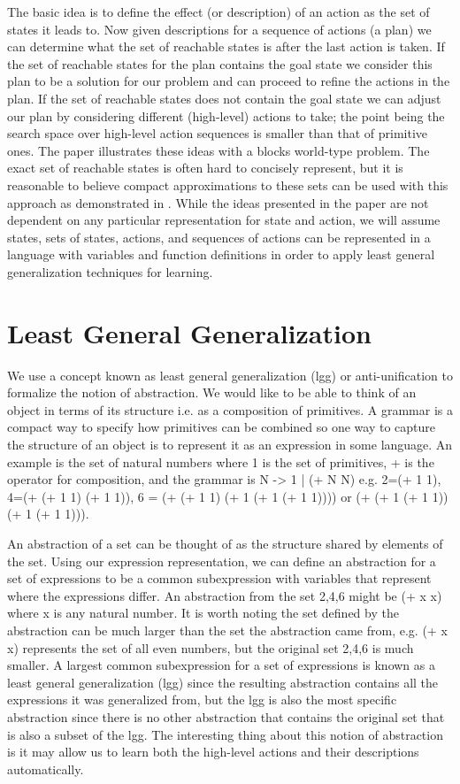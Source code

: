 \documentclass[a4paper,12pt]{article}
\begin{document}
The basic idea is to define the effect (or description) of an action as the set of states it leads to.  Now given descriptions for a sequence of actions (a plan) we can determine what the set of reachable states is after the last action is taken. If the set of reachable states for the plan contains the goal state we consider this plan to be a solution for our problem and can proceed to refine the actions in the plan.  If the set of reachable states does not contain the goal state we can adjust our plan by considering different (high-level) actions to take; the point being the search space over high-level action sequences is smaller than that of primitive ones.  The paper illustrates these ideas with a blocks world-type problem.  The exact set of reachable states is often hard to concisely represent, but it is reasonable to believe compact approximations to these sets can be used with this approach as demonstrated in \cite{ang-sem}.  While the ideas presented in the paper are not dependent on any particular representation for state and action, we will assume states, sets of states, actions, and sequences of actions can be represented in a language with variables and function definitions in order to apply least general generalization techniques for learning.

\section{Least General Generalization}
We use a concept known as least general generalization (lgg) or anti-unification to formalize the notion of abstraction.  We would like to be able to think of an object in terms of its structure i.e. as a composition of primitives.  A grammar is a compact way to specify how primitives can be combined so one way to capture the structure of an object is to represent it as an expression in some language.  An example is the set of natural numbers where {1} is the set of primitives, + is the operator for composition, and the grammar is N -> 1 | (+ N N) e.g. 2=(+ 1 1), 4=(+ (+ 1 1) (+ 1 1)), 6 = (+ (+ 1 1) (+ 1 (+ 1 (+ 1 1)))) or (+ (+ 1 (+ 1 1)) (+ 1 (+ 1 1))). 

An abstraction of a set can be thought of as the structure shared by elements of the set.  Using our expression representation, we can define an abstraction for a set of expressions to be a common subexpression with variables that represent where the expressions differ.    An abstraction from the set {2,4,6} might be (+ x x) where x is any natural number.  It is worth noting the set defined by the abstraction can be much larger than the set the abstraction came from, e.g. (+ x x) represents the set of all even numbers, but the original set {2,4,6} is much smaller.  A largest common subexpression for a set of expressions is known as a least general generalization (lgg) since the resulting abstraction contains all the expressions it was generalized from, but the lgg is also the most specific abstraction since there is no other abstraction that contains the original set that is also a subset of the lgg.  The interesting thing about this notion of abstraction is it may allow us to learn both the high-level actions and their descriptions automatically.
\end{document}

